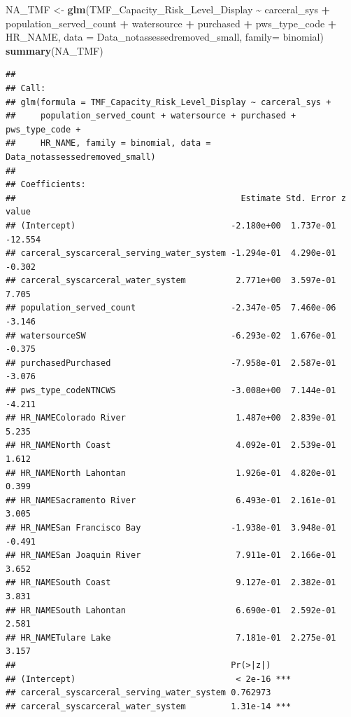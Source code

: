 \documentclass[
]{article}
\newenvironment{Shaded}{\begin{snugshade}}{\end{snugshade}}
\newcommand{\AttributeTok}[1]{\textcolor[rgb]{0.13,0.29,0.53}{#1}}
\newcommand{\FunctionTok}[1]{\textcolor[rgb]{0.13,0.29,0.53}{\textbf{#1}}}
\newcommand{\NormalTok}[1]{#1}
\newcommand{\OtherTok}[1]{\textcolor[rgb]{0.56,0.35,0.01}{#1}}
\newcommand{\SpecialCharTok}[1]{\textcolor[rgb]{0.81,0.36,0.00}{\textbf{#1}}}
\begin{document}
\begin{Shaded}
\begin{Highlighting}[]
\NormalTok{NA\_TMF }\OtherTok{\textless{}{-}} \FunctionTok{glm}\NormalTok{(TMF\_Capacity\_Risk\_Level\_Display }\SpecialCharTok{\textasciitilde{}}\NormalTok{ carceral\_sys }\SpecialCharTok{+}\NormalTok{ population\_served\_count }\SpecialCharTok{+}\NormalTok{ watersource }\SpecialCharTok{+}\NormalTok{ purchased }\SpecialCharTok{+}\NormalTok{ pws\_type\_code }\SpecialCharTok{+}\NormalTok{ HR\_NAME, }\AttributeTok{data =}\NormalTok{ Data\_notassessedremoved\_small, }\AttributeTok{family=}\NormalTok{ binomial)}
\FunctionTok{summary}\NormalTok{(NA\_TMF)}
\end{Highlighting}
\end{Shaded}

\begin{verbatim}
## 
## Call:
## glm(formula = TMF_Capacity_Risk_Level_Display ~ carceral_sys + 
##     population_served_count + watersource + purchased + pws_type_code + 
##     HR_NAME, family = binomial, data = Data_notassessedremoved_small)
## 
## Coefficients:
##                                             Estimate Std. Error z value
## (Intercept)                               -2.180e+00  1.737e-01 -12.554
## carceral_syscarceral_serving_water_system -1.294e-01  4.290e-01  -0.302
## carceral_syscarceral_water_system          2.771e+00  3.597e-01   7.705
## population_served_count                   -2.347e-05  7.460e-06  -3.146
## watersourceSW                             -6.293e-02  1.676e-01  -0.375
## purchasedPurchased                        -7.958e-01  2.587e-01  -3.076
## pws_type_codeNTNCWS                       -3.008e+00  7.144e-01  -4.211
## HR_NAMEColorado River                      1.487e+00  2.839e-01   5.235
## HR_NAMENorth Coast                         4.092e-01  2.539e-01   1.612
## HR_NAMENorth Lahontan                      1.926e-01  4.820e-01   0.399
## HR_NAMESacramento River                    6.493e-01  2.161e-01   3.005
## HR_NAMESan Francisco Bay                  -1.938e-01  3.948e-01  -0.491
## HR_NAMESan Joaquin River                   7.911e-01  2.166e-01   3.652
## HR_NAMESouth Coast                         9.127e-01  2.382e-01   3.831
## HR_NAMESouth Lahontan                      6.690e-01  2.592e-01   2.581
## HR_NAMETulare Lake                         7.181e-01  2.275e-01   3.157
##                                           Pr(>|z|)    
## (Intercept)                                < 2e-16 ***
## carceral_syscarceral_serving_water_system 0.762973    
## carceral_syscarceral_water_system         1.31e-14 ***

\end{verbatim}
\end{document}
